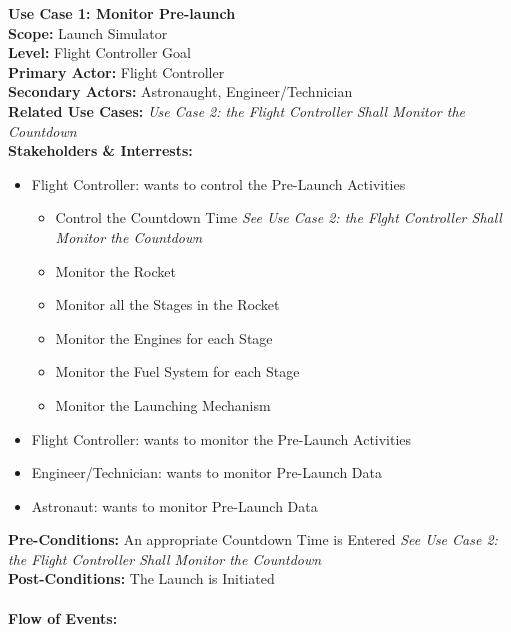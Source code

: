 \documentclass[letterpaper]{article}
\begin{document}
\noindent
\textbf{Use Case 1:  Monitor Pre-launch}\\
\textbf{Scope:  }Launch Simulator\\
\textbf{Level:  }Flight Controller Goal\\
\textbf{Primary Actor:  }Flight Controller\\
\textbf{Secondary Actors:  }Astronaught, Engineer/Technician\\
\textbf{Related Use Cases:  }\textit{Use Case 2:  the Flight
Controller Shall Monitor the Countdown}\\
\textbf{Stakeholders \& Interrests:  }
\begin{itemize}
\item Flight Controller: wants to control the Pre-Launch Activities
\begin{itemize}
\item Control the Countdown Time \textit{See Use Case 2:  the Flght
Controller Shall Monitor the Countdown}
\item Monitor the Rocket
\item Monitor all the Stages in the Rocket
\item Monitor the Engines for each Stage
\item Monitor the Fuel System for each Stage
\item Monitor the Launching Mechanism
\end{itemize}
\item Flight Controller: wants to monitor the Pre-Launch Activities
\item Engineer/Technician:  wants to monitor Pre-Launch Data
\item Astronaut:  wants to monitor Pre-Launch Data
\end{itemize}
\textbf{Pre-Conditions:  }An appropriate Countdown Time is Entered
\textit{See Use Case 2:  the Flight Controller Shall Monitor the
Countdown}\\
\textbf{Post-Conditions:  }The Launch is Initiated\\\\
\textbf{Flow of Events:}\\
\end{document}
